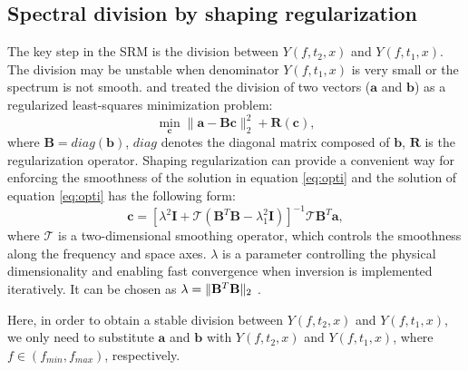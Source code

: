 \subsection{Spectral division by shaping regularization}
The key step in the SRM is the division between $Y(f,t_2,x)$ and $Y(f,t_1,x)$. The division may be unstable when denominator $Y(f,t_1,x)$ is very small or the spectrum is not smooth. \cite{fomel2007localattr} and \cite{guochang2010} treated the division of two vectors ($\mathbf{a}$ and $\mathbf{b}$) as a regularized least-squares minimization problem:
\begin{equation}
\label{eq:opti}
\min_{\mathbf{c}} \parallel \mathbf{a} -\mathbf{B}\mathbf{c} \parallel_2^2 + \mathbf{R}(\mathbf{c}),
\end{equation}  
where $\mathbf{B}=diag(\mathbf{b})$, $diag$ denotes the diagonal matrix composed of $\mathbf{b}$, $\mathbf{R}$ is the regularization operator. Shaping regularization \cite[]{fomel2007shape} can provide a convenient way for enforcing the smoothness of the solution in equation \ref{eq:opti} and the solution of equation \ref{eq:opti} has the following form:
\begin{equation}
\label{eq:solu}
\mathbf{c} = [\lambda^2\mathbf{I} + \mathcal{T}(\mathbf{B}^T\mathbf{B}-\lambda_1^2\mathbf{I})]^{-1}\mathcal{T}\mathbf{B}^T\mathbf{a},
\end{equation}
where $\mathbf{\mathcal{T}}$ is a two-dimensional smoothing operator, which controls the smoothness along the frequency and space axes. $\lambda$ is a parameter controlling the physical dimensionality and enabling fast convergence when inversion is implemented iteratively. It can be chosen as $\lambda  = \Arrowvert\mathbf{B}^T\mathbf{B}\Arrowvert_2$ \cite[]{fomel2007localattr}. 

Here, in order to obtain a stable division between $Y(f,t_2,x)$ and $Y(f,t_1,x)$, we only need to substitute $\mathbf{a}$ and $\mathbf{b}$ with $Y(f,t_2,x)$ and $Y(f,t_1,x)$, where $f\in(f_{min},f_{max})$, respectively.

